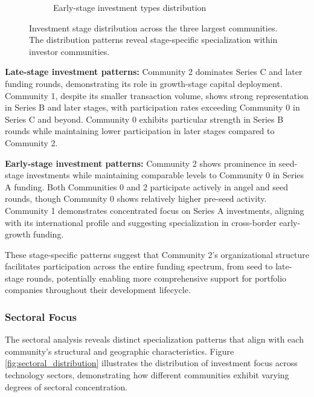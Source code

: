 \begin{figure}[htbp]
\begin{subfigure}[t]{0.48\textwidth}
    \caption{Early-stage investment types distribution}
    \label{fig:early_stage_types}
\end{subfigure}
\caption{Investment stage distribution across the three largest communities. The distribution patterns reveal stage-specific specialization within investor communities.}
\label{fig:investment_stage_distribution}
\end{figure}

\textbf{Late-stage investment patterns:} Community 2 dominates Series C and later funding rounds, demonstrating its role in growth-stage capital deployment. Community 1, despite its smaller transaction volume, shows strong representation in Series B and later stages, with participation rates exceeding Community 0 in Series C and beyond. Community 0 exhibits particular strength in Series B rounds while maintaining lower participation in later stages compared to Community 2.

\textbf{Early-stage investment patterns:} Community 2 shows prominence in seed-stage investments while maintaining comparable levels to Community 0 in Series A funding. Both Communities 0 and 2 participate actively in angel and seed rounds, though Community 0 shows relatively higher pre-seed activity. Community 1 demonstrates concentrated focus on Series A investments, aligning with its international profile and suggesting specialization in cross-border early-growth funding.

These stage-specific patterns suggest that Community 2's organizational structure facilitates participation across the entire funding spectrum, from seed to late-stage rounds, potentially enabling more comprehensive support for portfolio companies throughout their development lifecycle.

\subsubsection{Sectoral Focus}

The sectoral analysis reveals distinct specialization patterns that align with each community's structural and geographic characteristics. Figure \ref{fig:sectoral_distribution} illustrates the distribution of investment focus across technology sectors, demonstrating how different communities exhibit varying degrees of sectoral concentration.

